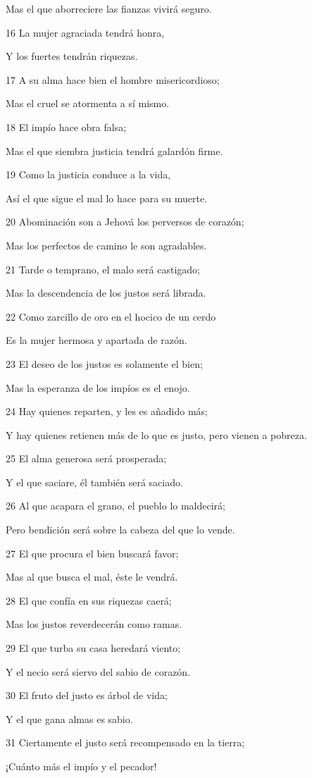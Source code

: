 \par Mas el que aborreciere las fianzas vivirá seguro.
\par 16 La mujer agraciada tendrá honra,
\par Y los fuertes tendrán riquezas.
\par 17 A su alma hace bien el hombre misericordioso;
\par Mas el cruel se atormenta a sí mismo.
\par 18 El impío hace obra falsa;
\par Mas el que siembra justicia tendrá galardón firme.
\par 19 Como la justicia conduce a la vida,
\par Así el que sigue el mal lo hace para su muerte.
\par 20 Abominación son a Jehová los perversos de corazón; 
\par Mas los perfectos de camino le son agradables.
\par 21 Tarde o temprano, el malo será castigado;
\par Mas la descendencia de los justos será librada.
\par 22 Como zarcillo de oro en el hocico de un cerdo
\par Es la mujer hermosa y apartada de razón.
\par 23 El deseo de los justos es solamente el bien;
\par Mas la esperanza de los impíos es el enojo.
\par 24 Hay quienes reparten, y les es añadido más;
\par Y hay quienes retienen más de lo que es justo, pero vienen a pobreza.
\par 25 El alma generosa será prosperada;
\par Y el que saciare, él también será saciado.
\par 26 Al que acapara el grano, el pueblo lo maldecirá;
\par Pero bendición será sobre la cabeza del que lo vende.
\par 27 El que procura el bien buscará favor;
\par Mas al que busca el mal, éste le vendrá.
\par 28 El que confía en sus riquezas caerá;
\par Mas los justos reverdecerán como ramas.
\par 29 El que turba su casa heredará viento; 
\par Y el necio será siervo del sabio de corazón.
\par 30 El fruto del justo es árbol de vida;
\par Y el que gana almas es sabio.
\par 31 Ciertamente el justo será recompensado en la tierra;
\par ¡Cuánto más el impío y el pecador!

